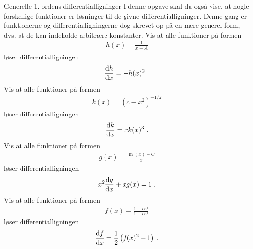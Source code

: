 \begin{opgave}{Generelle 1. ordens differentialligninger}
I denne opgave skal du også vise, at nogle forskellige funktioner er løsninger til de givne differentialligninger. Denne gang er funktionerne og differentialligningerne dog skrevet op på en mere generel form, dvs. at de kan indeholde arbitrære konstanter.
\opg Vis at alle funktioner på formen
\begin{align*}
	h(x) = \frac{1}{x + A} 
\end{align*}
løser differentialligningen
\begin{align*}
	\dv{h}{x} = - h(x)^2 \; .
\end{align*}
\opg Vis at alle funktioner på formen
\begin{align*}
	k(x) = \left( c - x^2 \right)^{-1/2}
\end{align*}
løser differentialligningen
\begin{align*}
	\dv{k}{x} = x k(x)^3 \; .
\end{align*}
\opg Vis at alle funktioner på formen
\begin{align*}
	g(x) = \frac{\ln (x) + C}{x}
\end{align*}
løser differentialligningen
\begin{align*}
	x^2 \dv{g}{x} + xg(x) = 1 \; .
\end{align*} 
\opg Vis at alle funktioner på formen
\begin{align*}
	f(x) = \frac{1 + ce^x}{1-ce^x}
\end{align*}
løser differentialligningen
\begin{align*}
	\dv{f}{x} = \frac{1}{2} \left( f(x)^2 - 1 \right) \; .
\end{align*} 
\end{opgave}
